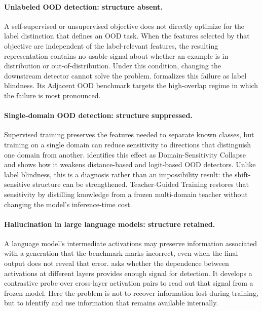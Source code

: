 \paragraph{Unlabeled OOD detection: structure absent.}
A self-supervised or unsupervised objective does not directly optimize for the
label distinction that defines an OOD task. When the features selected by that
objective are independent of the label-relevant features, the resulting
representation contains no usable signal about whether an example is
in-distribution or out-of-distribution. Under this condition, changing the
downstream detector cannot solve the problem. 
formalizes this failure as label blindness. Its Adjacent OOD benchmark targets
the high-overlap regime in which the failure is most pronounced.

\paragraph{Single-domain OOD detection: structure suppressed.}
Supervised training preserves the features needed to separate known classes, but
training on a single domain can reduce sensitivity to directions that distinguish
one domain from another.  identifies this
effect as Domain-Sensitivity Collapse and shows how it weakens distance-based and
logit-based OOD detectors. Unlike label blindness, this is a diagnosis rather
than an impossibility result: the shift-sensitive structure can be strengthened.
Teacher-Guided Training restores that sensitivity by distilling knowledge from a
frozen multi-domain teacher without changing the model's inference-time cost.

\paragraph{Hallucination in large language models: structure retained.}
A language model's intermediate activations may preserve information associated
with a generation that the benchmark marks incorrect, even when the final output
does not reveal that error.
 asks whether the dependence between activations
at different layers provides enough signal for detection. It develops a
contrastive probe over cross-layer activation pairs to read out that signal from
a frozen model. Here the problem is not to recover information lost during
training, but to identify and use information that remains available internally.


